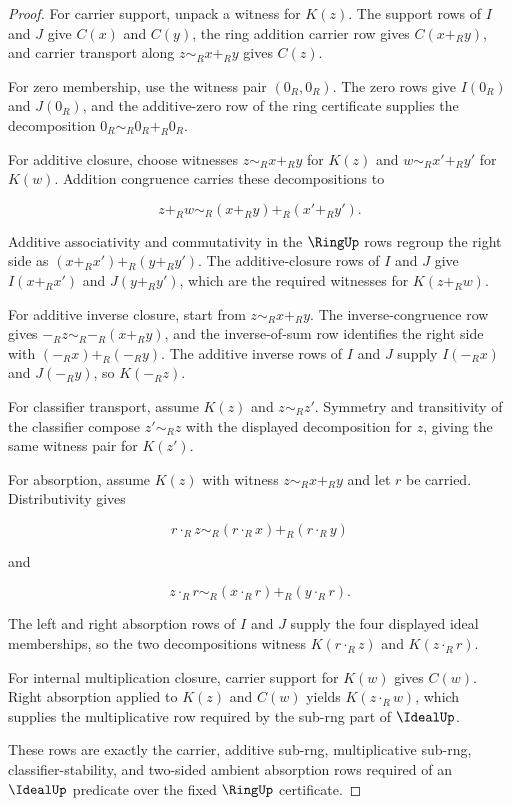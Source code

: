 \begin{proof}
For carrier support, unpack a witness for $K(z)$. The support rows of $I$ and $J$ give $C(x)$ and $C(y)$, the ring addition carrier row gives $C(x+_R y)$, and carrier transport along $z\sim_R x+_R y$ gives $C(z)$.

For zero membership, use the witness pair $(0_R,0_R)$. The zero rows give $I(0_R)$ and $J(0_R)$, and the additive-zero row of the ring certificate supplies the decomposition $0_R\sim_R0_R+_R0_R$.

For additive closure, choose witnesses $z\sim_R x+_R y$ for $K(z)$ and $w\sim_R x'+_R y'$ for $K(w)$. Addition congruence carries these decompositions to

$$
z+_R w\sim_R (x+_R y)+_R(x'+_R y').
$$

Additive associativity and commutativity in the $\RingUp$ rows regroup the right side as $(x+_R x')+_R(y+_R y')$. The additive-closure rows of $I$ and $J$ give $I(x+_R x')$ and $J(y+_R y')$, which are the required witnesses for $K(z+_R w)$.

For additive inverse closure, start from $z\sim_R x+_R y$. The inverse-congruence row gives $-_R z\sim_R -_R(x+_R y)$, and the inverse-of-sum row identifies the right side with $(-_R x)+_R(-_R y)$. The additive inverse rows of $I$ and $J$ supply $I(-_R x)$ and $J(-_R y)$, so $K(-_R z)$.

For classifier transport, assume $K(z)$ and $z\sim_R z'$. Symmetry and transitivity of the classifier compose $z'\sim_R z$ with the displayed decomposition for $z$, giving the same witness pair for $K(z')$.

For absorption, assume $K(z)$ with witness $z\sim_R x+_R y$ and let $r$ be carried. Distributivity gives

$$
r\cdot_R z\sim_R (r\cdot_R x)+_R(r\cdot_R y)
$$

and

$$
z\cdot_R r\sim_R (x\cdot_R r)+_R(y\cdot_R r).
$$

The left and right absorption rows of $I$ and $J$ supply the four displayed ideal memberships, so the two decompositions witness $K(r\cdot_R z)$ and $K(z\cdot_R r)$.

For internal multiplication closure, carrier support for $K(w)$ gives $C(w)$. Right absorption applied to $K(z)$ and $C(w)$ yields $K(z\cdot_R w)$, which supplies the multiplicative row required by the sub-rng part of $\IdealUp$.

These rows are exactly the carrier, additive sub-rng, multiplicative sub-rng, classifier-stability, and two-sided ambient absorption rows required of an $\IdealUp$ predicate over the fixed $\RingUp$ certificate.
\end{proof}

